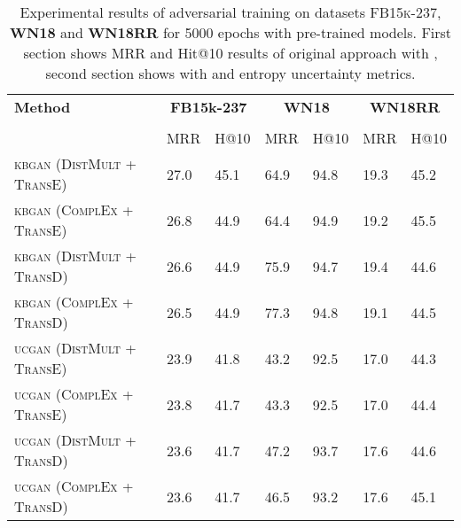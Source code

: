 \begin{table}[h]
    \centering
    \begin{tabular}{lllllll}
        \toprule
        \textbf{Method} &
        \multicolumn{2}{c}{\textbf{FB15k-237}} & 
        \multicolumn{2}{c}{\textbf{WN18}} & 
        \multicolumn{2}{c}{\textbf{WN18RR}}\\
        
        \cmidrule{2-6} \cmidrule{7-7} \\
        {} & MRR & H@10 & MRR & H@10 & MRR & H@10 \\
    
        \midrule
          
          \textsc{kbgan} (\textsc{DistMult} + \textsc{TransE})  
          & 27.0  & 45.1 & 64.9 & 94.8 & 19.3 & 45.2 \\
          
          \textsc{kbgan} (\textsc{ComplEx} + \textsc{TransE})  
          & 26.8  & 44.9 & 64.4 & 94.9 & 19.2 & 45.5 \\
          
          \textsc{kbgan} (\textsc{DistMult} + \textsc{TransD})  
          & 26.6  & 44.9 & 75.9 & 94.7 & 19.4 & 44.6 \\

          \textsc{kbgan} (\textsc{ComplEx} + \textsc{TransD})  
          & 26.5 & 44.9 & 77.3 & 94.8 & 19.1 & 44.5 \\
          
          \midrule
          
          \textsc{ucgan} (\textsc{DistMult} + \textsc{TransE})  
          & 23.9 & 41.8 & 43.2 & 92.5 & 17.0 & 44.3 \\
          
          \textsc{ucgan} (\textsc{ComplEx} + \textsc{TransE})  
          & 23.8 & 41.7 & 43.3 & 92.5 & 17.0 & 44.4 \\
          
          \textsc{ucgan} (\textsc{DistMult} + \textsc{TransD})  
          & 23.6  & 41.7 & 47.2 & 93.7 & 17.6 & 44.6 \\

          \textsc{ucgan} (\textsc{ComplEx} + \textsc{TransD})  
          & 23.6 & 41.7 & 46.5 & 93.2 & 17.6 & 45.1 \\
  
        \bottomrule
    \end{tabular}
    \caption{Experimental results of adversarial training on datasets \textsc{FB15k-237}, \textbf{WN18} and \textbf{WN18RR} for 5000 epochs with pre-trained models.
    First section shows MRR and Hit@10 results of original \kbgan approach with \origsampling, second section shows 
    \usgan with \ussoftmax and entropy uncertainty metrics.}
\label{tab:result_table2_5k_epochs}
\end{table}